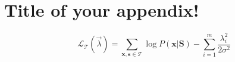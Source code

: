 \chapter{Title of your appendix!}
\label{appEuler:derivation}

\lipsum[66]
\begin{equation}
    \mathcal{L}_{\mathcal{T}}(\vec{\lambda}) = \sum_{\mathbf{x},\mathbf{s}\in\mathcal{T}} \log P(\mathbf{x}|\mathbf{S}) - \sum_{i=1}^m \frac{\lambda_i^2}{2\sigma^2}
\end{equation}

\lipsum[66]